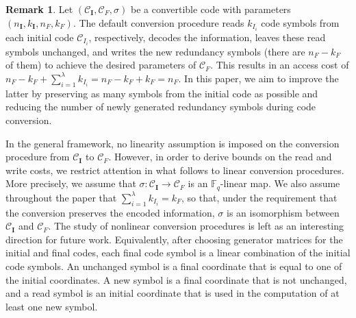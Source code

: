 \documentclass[conference, 10pt]{IEEEtran}
\theoremstyle{plain}
\theoremstyle{definition}
\newtheorem{remark}[definition]{Remark}
\newcommand{\mC}{\mathcal{C}}
\begin{document}
\begin{remark} \label{rem:default}
Let $(\mC_\textbf{I},\mC_F,\sigma)$ be a convertible code with parameters $(n_\textbf{I},k_\textbf{I},n_F,k_F)$. The default conversion procedure reads $k_{I_i}$ code symbols from each initial code $\mC_{I_i}$, respectively, decodes the information, leaves these read symbols unchanged, and writes the new redundancy symbols (there are $n_F-k_F$ of them) to achieve the desired parameters of $\mC_F$. This results in an access cost of $n_F-k_F+\sum_{i=1}^{\lambda}k_{I_i}=n_F-k_F+k_F=n_F$. In this paper, we aim to improve the latter by preserving as many symbols from the initial code as possible and reducing the number of newly generated redundancy symbols during code conversion. 
\end{remark}


In the general framework, no linearity assumption is imposed on the conversion procedure
from $\mathcal C_{\mathbf I}$ to $\mathcal C_F$. However, in order to derive bounds on the
read and write costs, we restrict attention in what follows to linear conversion procedures.
More precisely, we assume that $\sigma:\mathcal C_{\mathbf I}\to \mathcal C_F$ is an $\mathbb F_q$-linear map. We also assume throughout the paper that
$\sum_{i=1}^{\lambda} k_{I_i}=k_F$, so that, under the requirement that the conversion preserves the encoded information, $\sigma$ is an isomorphism between $\mathcal C_{\mathbf I}$ and $\mathcal C_F$. The study of nonlinear conversion procedures is left as an interesting direction for future work.
Equivalently, after choosing generator matrices for the initial and final codes, 
each final
code symbol is a linear combination of the initial code symbols. An unchanged symbol is a
final coordinate that is equal to one of the initial coordinates. A new symbol is a final
coordinate that is not unchanged, and a read symbol is an initial coordinate that is used in
the computation of at least one new symbol.
\end{document}
